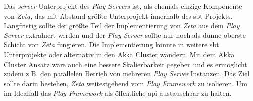 Das \textit{server} Unterprojekt des \textit{Play Servers} ist, als ehemals einzige Komponente von \textit{Zeta}, das mit Abstand größte Unterprojekt innerhalb des \ac{sbt} Projekts. Langfristig sollte der größte Teil der Implementierung von \textit{Zeta} aus dem \textit{Play Server} extrahiert werden und der \textit{Play Server} sollte nur noch als dünne oberste Schicht von \textit{Zeta} fungieren. Die Implementierung könnte in weitere \ac{sbt} Unterprojekte oder alternativ in den Akka Cluster wandern. Mit dem Akka Cluster Ansatz wäre auch eine bessere Skalierbarkeit gegeben und es ermöglicht zudem z.B. den parallelen Betrieb von mehreren \textit{Play Server} Instanzen. Das Ziel sollte darin bestehen, \textit{Zeta} weitestgehend vom \textit{Play Framework} zu isolieren. Um im Idealfall das \textit{Play Framework} als öffentliche \ac{api} austauschbar zu halten.


